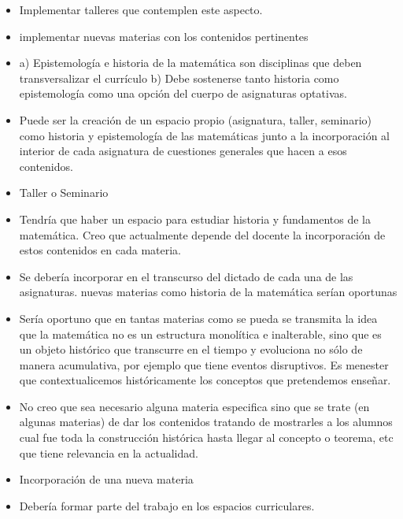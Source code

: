 \documentclass[a4paper,10pt,BCOR10mm,oneside,headsepline]{scrbook}
\begin{document}
\begin{subappendices}
\begin{itemize}
 \item Implementar talleres que contemplen este aspecto. 

 \item implementar nuevas materias con los contenidos pertinentes

 \item a) Epistemología e historia de la matemática son disciplinas que deben transversalizar el currículo b) Debe sostenerse tanto historia como epistemología como una opción del cuerpo de asignaturas optativas.

 \item Puede ser la creación de un espacio propio (asignatura, taller, seminario) como historia y epistemología de las matemáticas junto a la incorporación al interior de cada asignatura de cuestiones generales que hacen a esos contenidos. 

 \item Taller o Seminario

 \item Tendría que haber un espacio para estudiar historia y fundamentos de la matemática. Creo que actualmente depende del docente la incorporación de estos contenidos en cada materia.

 \item Se debería incorporar en el transcurso del dictado de cada una de las asignaturas.
nuevas materias como historia de la matemática serían oportunas

\item Sería oportuno que en tantas materias como se pueda se transmita la idea que la matemática no es un estructura monolítica e inalterable, sino que es un objeto histórico que transcurre en el tiempo y evoluciona no sólo de manera acumulativa, por ejemplo que tiene eventos disruptivos. Es menester que contextualicemos históricamente los conceptos que pretendemos enseñar.  

\item No creo que sea necesario alguna materia especifica sino que se trate (en algunas materias) de dar los contenidos tratando de mostrarles a los alumnos cual fue toda la construcción histórica hasta llegar al concepto o teorema, etc que tiene relevancia en la actualidad.

\item Incorporación de una  nueva materia

\item Debería formar parte del trabajo en los espacios curriculares.


\end{itemize}
\end{subappendices}
\end{document}
